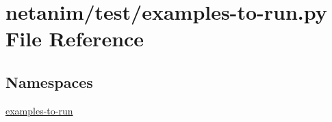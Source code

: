 \hypertarget{netanim_2test_2examples-to-run_8py}{}\section{netanim/test/examples-\/to-\/run.py File Reference}
\label{netanim_2test_2examples-to-run_8py}
\subsection*{Namespaces}
\begin{DoxyCompactItemize}
\item 
 \hyperlink{namespaceexamples-to-run}{examples-\/to-\/run}
\end{DoxyCompactItemize}
